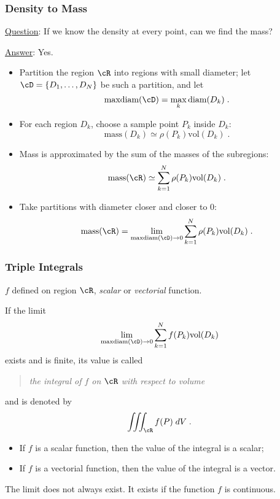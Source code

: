 \begin{frame}
  \frametitle{Density to Mass}
  \underline{Question}: If we know the density at every point, can we find the mass?

  \underline{Answer}: Yes.

\begin{itemize}
  \item Partition the region $\cR$ into regions with small diameter; let $\cD=\{D_1,\ldots,D_N\}$ be such a partition, and let
      $$\text{maxdiam}(\cD) = \max_{k} \text{diam}(D_k)\; .$$
  \item For each region $D_k$, choose a sample point $P_k$ inside $D_k$:
      $$\text{mass}(D_k) \simeq \rho(P_k) \text{vol}(D_k)\; .$$
      \item Mass is approximated by the sum of the masses of the subregions:
      $$\text{mass}(\cR) \simeq \sum_{k=1}^{N} \rho(P_k)\text{vol}(D_k)\; .$$
      \item Take partitions with diameter closer and closer to 0:
      $$\text{mass}(\cR) = \lim_{\text{maxdiam}(\cD) \to 0}  \sum_{k=1}^{N} \rho(P_k)\text{vol}(D_k)\; .$$
\end{itemize}
\end{frame}

\begin{frame}
  \frametitle{Triple Integrals}

  $f$ defined on region $\cR$, \emph{scalar} or \emph{vectorial} function.

  \begin{definition}
  If the limit
%
$$\lim_{\text{maxdiam}(\cD) \to 0}  \sum_{k=1}^{N} f(P_k)\text{vol}(D_k)$$
%
exists and is finite, its value is called
\begin{quote}
  \emph{the integral of $f$ on $\cR$ with respect to volume}
\end{quote}
 and is denoted by
%
$$\int\!\!\!\int\!\!\!\int_{\cR} f(P) \; dV\; .$$
  \end{definition}

\begin{itemize}
  \item If $f$ is a scalar function, then the value of the integral is a scalar;
  \item If $f$ is a vectorial function, then the value of the integral is a vector.
\end{itemize}

The limit does not always exist. It exists if the function $f$ is continuous.

\end{frame}


